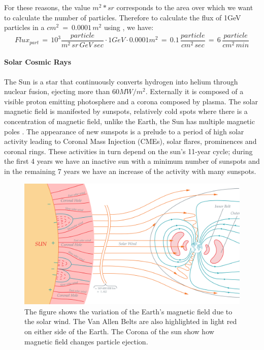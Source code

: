 {{{{{						For these reasons, the value $m^2*sr$ corresponds to the area over which we want to calculate the number of particles. Therefore to calculate the flux of 1GeV particles  in a $cm^2\:=\:0.0001\,m^2$ using , we have:
						\begin{equation}
							Flux_{part}\,=\,10^3 \frac{particle}{m^2\,sr\,GeV\,sec}\cdot 1GeV \cdot 0.0001m^2 \, =\, 0.1\,\frac{particle}{cm^2\,sec} \,=\, 6\,\frac{particle}{cm^2\,min}
						\end{equation} 
						
						
				}%
				  
				\paragraph{Solar Cosmic Rays}{
					The Sun is a star that continuously converts hydrogen into helium through nuclear fusion, ejecting more than $60MW/m^2$. Externally it is composed of a visible proton emitting photosphere and a corona composed by plasma. The solar magnetic field is manifested by sunspots, relatively cold spots where there is a concentration of magnetic field, unlike the Earth, the Sun has multiple magnetic poles  . The appearance of new sunspots is a prelude to a period of high solar activity leading to Coronal Mass Injection (CMEs), solar flares, prominences and coronal rings. These activities in turn depend on the sun's 11-year cycle; during the first 4 years we have an inactive sun with a minimum number of sunspots and in the remaining 7 years we have an increase of the  activity  with many sunspots. 
					\begin{figure}[H]
					\centering
					\includegraphics[width=\textwidth,center]{./images/Magnetosfera_e_raggi_solari_coronalHole.png}
					\caption{The figure shows the variation of the Earth's magnetic field due to the solar wind. The Van Allen Belts are also highlighted in light red on either side of the Earth. The Corona of the sun show how magnetic field changes particle ejection.}
					\label{fig:MagnetosphereVanAllenBelts}
					\end{figure} 
				
}}}}}
